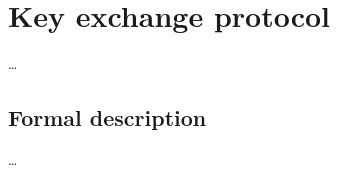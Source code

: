 \section{Key exchange protocol}\label{sec:keyxchng}

\ldots

\subsection{Formal description}\label{subsec:formal}

\ldots
